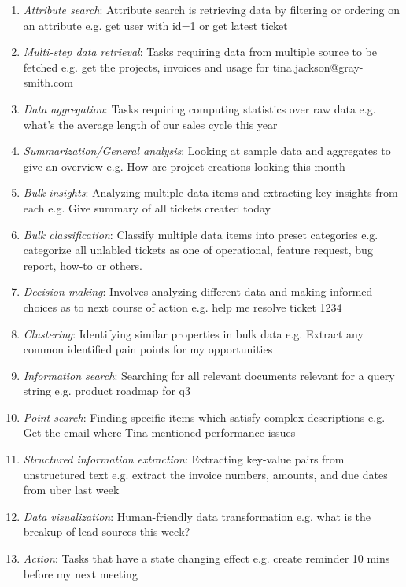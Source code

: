 \documentclass[11pt,a4paper]{article}
\begin{document}
\begin{enumerate}
    \item \textit{Attribute search}: Attribute search is retrieving data by filtering or ordering on an attribute e.g. get user with id=1 or get latest ticket
    \item \textit{Multi-step data retrieval}: Tasks requiring data from multiple source to be fetched e.g. get the projects, invoices and usage for tina.jackson@gray-smith.com
    \item \textit{Data aggregation}: Tasks requiring computing statistics over raw data e.g. what’s the average length of our sales cycle this year
    \item \textit{Summarization/General analysis}: Looking at sample data and aggregates to give an overview e.g. How are project creations looking this month
    \item \textit{Bulk insights}: Analyzing multiple data items and extracting key insights from each e.g. Give summary of all tickets created today
    \item \textit{Bulk classification}: Classify multiple data items into preset categories e.g. categorize all unlabled tickets as one of operational, feature request, bug report, how-to or others.
    \item \textit{Decision making}: Involves analyzing different data and making informed choices as to next course of action e.g. help me resolve ticket 1234
    \item \textit{Clustering}: Identifying similar properties in bulk data e.g. Extract any common identified pain points for my opportunities
    \item \textit{Information search}: Searching for all relevant documents relevant for a query string e.g. product roadmap for q3
    \item \textit{Point search}: Finding specific items which satisfy complex descriptions e.g. Get the email where Tina mentioned performance issues
    \item \textit{Structured information extraction}: Extracting key-value pairs from unstructured text e.g. extract the invoice numbers, amounts, and due dates from uber last week
    \item \textit{Data visualization}: Human-friendly data transformation e.g. what is the breakup of lead sources this week?
    \item \textit{Action}:  Tasks that have a state changing effect e.g. create reminder 10 mins before my next meeting
\end{enumerate}
\end{document}
